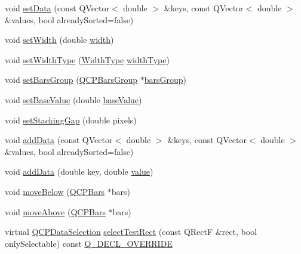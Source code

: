 \begin{DoxyCompactItemize}
\item 
void \mbox{\hyperlink{class_q_c_p_bars_a2a88cd5b16ec7b71e5a590f95b50c5ce}{set\+Data}} (const Q\+Vector$<$ double $>$ \&keys, const Q\+Vector$<$ double $>$ \&values, bool already\+Sorted=false)
\item 
void \mbox{\hyperlink{class_q_c_p_bars_afec6116579d44d5b706e0fa5e5332507}{set\+Width}} (double \mbox{\hyperlink{class_q_c_p_bars_abe7eb3987d8711f45829db879aee2280}{width}})
\item 
void \mbox{\hyperlink{class_q_c_p_bars_adcaa3b41281bb2c0f7949b341592fcc0}{set\+Width\+Type}} (\mbox{\hyperlink{class_q_c_p_bars_a65dbbf1ab41cbe993d71521096ed4649}{Width\+Type}} \mbox{\hyperlink{class_q_c_p_bars_a4c103fb405a45f47853e0345f0c6e708}{width\+Type}})
\item 
void \mbox{\hyperlink{class_q_c_p_bars_aedd1709061f0b307c47ddb45e172ef9a}{set\+Bars\+Group}} (\mbox{\hyperlink{class_q_c_p_bars_group}{Q\+C\+P\+Bars\+Group}} $\ast$\mbox{\hyperlink{class_q_c_p_bars_a5eef59840b68d205df4e0c3df5f97633}{bars\+Group}})
\item 
void \mbox{\hyperlink{class_q_c_p_bars_a574ec7eb7537566df1a28ff085d75623}{set\+Base\+Value}} (double \mbox{\hyperlink{class_q_c_p_bars_a29a7b3b86f80b2a04bd1f9ec0ebaf422}{base\+Value}})
\item 
void \mbox{\hyperlink{class_q_c_p_bars_aeacf7561afb1c70284b22822b57c7bb5}{set\+Stacking\+Gap}} (double pixels)
\item 
void \mbox{\hyperlink{class_q_c_p_bars_a323d6970d6d6e3166d89916a7f60f733}{add\+Data}} (const Q\+Vector$<$ double $>$ \&keys, const Q\+Vector$<$ double $>$ \&values, bool already\+Sorted=false)
\item 
void \mbox{\hyperlink{class_q_c_p_bars_a684dd105403a5497fda42f2094fecbb7}{add\+Data}} (double key, double \mbox{\hyperlink{diffusion_8cpp_a4b41795815d9f3d03abfc739e666d5da}{value}})
\item 
void \mbox{\hyperlink{class_q_c_p_bars_a69fc371346980f19177c3d1ecdad78ee}{move\+Below}} (\mbox{\hyperlink{class_q_c_p_bars}{Q\+C\+P\+Bars}} $\ast$bars)
\item 
void \mbox{\hyperlink{class_q_c_p_bars_ac22e00a6a41509538c21b04f0a57318c}{move\+Above}} (\mbox{\hyperlink{class_q_c_p_bars}{Q\+C\+P\+Bars}} $\ast$bars)
\item 
virtual \mbox{\hyperlink{class_q_c_p_data_selection}{Q\+C\+P\+Data\+Selection}} \mbox{\hyperlink{class_q_c_p_bars_ab03bb6125c3e983b89d694f75ce6b3d5}{select\+Test\+Rect}} (const Q\+RectF \&rect, bool only\+Selectable) const \mbox{\hyperlink{qcustomplot_8h_a42cc5eaeb25b85f8b52d2a4b94c56f55}{Q\+\_\+\+D\+E\+C\+L\+\_\+\+O\+V\+E\+R\+R\+I\+DE}}

\end{DoxyCompactItemize}
